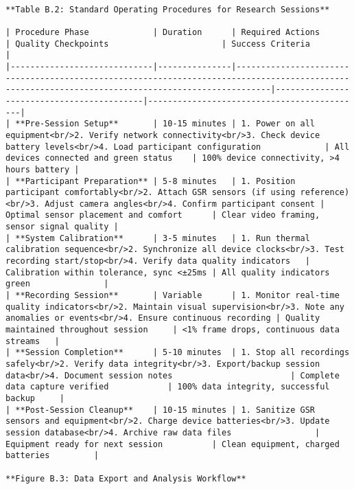 \documentclass[12pt,a4paper]{report}
\begin{document}
\begin{verbatim}

**Table B.2: Standard Operating Procedures for Research Sessions**

| Procedure Phase             | Duration      | Required Actions                                                                                                                                  | Quality Checkpoints                       | Success Criteria                           |
|-----------------------------|---------------|---------------------------------------------------------------------------------------------------------------------------------------------------|-------------------------------------------|--------------------------------------------|
| **Pre-Session Setup**       | 10-15 minutes | 1. Power on all equipment<br/>2. Verify network connectivity<br/>3. Check device battery levels<br/>4. Load participant configuration             | All devices connected and green status    | 100% device connectivity, >4 hours battery |
| **Participant Preparation** | 5-8 minutes   | 1. Position participant comfortably<br/>2. Attach GSR sensors (if using reference)<br/>3. Adjust camera angles<br/>4. Confirm participant consent | Optimal sensor placement and comfort      | Clear video framing, sensor signal quality |
| **System Calibration**      | 3-5 minutes   | 1. Run thermal calibration sequence<br/>2. Synchronize all device clocks<br/>3. Test recording start/stop<br/>4. Verify data quality indicators   | Calibration within tolerance, sync <±25ms | All quality indicators green               |
| **Recording Session**       | Variable      | 1. Monitor real-time quality indicators<br/>2. Maintain visual supervision<br/>3. Note any anomalies or events<br/>4. Ensure continuous recording | Quality maintained throughout session     | <1% frame drops, continuous data streams   |
| **Session Completion**      | 5-10 minutes  | 1. Stop all recordings safely<br/>2. Verify data integrity<br/>3. Export/backup session data<br/>4. Document session notes                        | Complete data capture verified            | 100% data integrity, successful backup     |
| **Post-Session Cleanup**    | 10-15 minutes | 1. Sanitize GSR sensors and equipment<br/>2. Charge device batteries<br/>3. Update session database<br/>4. Archive raw data files                 | Equipment ready for next session          | Clean equipment, charged batteries         |

**Figure B.3: Data Export and Analysis Workflow**

\end{verbatim}
\end{document}
